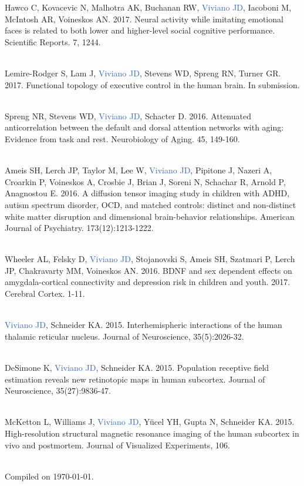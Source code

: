 \documentclass[a4paper,11pt,oneside]{book}
\begin{document}
\begin{flushleft}
Hawco C, Kovacevic N, Malhotra AK, Buchanan RW, \textcolor{highlight}{Viviano JD}, Iacoboni M, McIntosh AR, Voineskos AN. 2017. Neural activity while imitating emotional faces is related to both lower and higher-level social cognitive performance. Scientific Reports. 7, 1244. \\\

Lemire-Rodger S, Lam J, \textcolor{highlight}{Viviano JD}, Stevens WD, Spreng RN, Turner GR. 2017. Functional topology of executive control in the human brain. In submission. \\\

Spreng NR, Stevens WD, \textcolor{highlight}{Viviano JD}, Schacter D. 2016. Attenuated anticorrelation between the default and dorsal attention networks with aging: Evidence from task and rest. Neurobiology of Aging. 45, 149-160. \\\

Ameis SH, Lerch JP, Taylor M, Lee W, \textcolor{highlight}{Viviano JD}, Pipitone J, Nazeri A, Croarkin P, Voineskos A, Crosbie J, Brian J, Soreni N, Schachar R, Arnold P, Anagnostou E. 2016. A diffusion tensor imaging study in children with ADHD, autism spectrum disorder, OCD, and matched controls: distinct and non-distinct white matter disruption and dimensional brain-behavior relationships. American Journal of Psychiatry. 173(12):1213-1222. \\\

Wheeler AL, Felsky D, \textcolor{highlight}{Viviano JD}, Stojanovski S, Ameis SH, Szatmari P, Lerch JP, Chakravarty MM, Voineskos AN. 2016. BDNF and sex dependent effects on amygdala-cortical connectivity and depression risk in children and youth. 2017. Cerebral Cortex. 1-11. \\\

\textcolor{highlight}{Viviano JD}, Schneider KA. 2015. Interhemispheric interactions of the human thalamic reticular nucleus. Journal of Neuroscience, 35(5):2026-32. \\\

DeSimone K, \textcolor{highlight}{Viviano JD}, Schneider KA. 2015. Population receptive field estimation reveals new retinotopic maps in human subcortex. Journal of Neuroscience, 35(27):9836-47. \\\

McKetton L, Williams J, \textcolor{highlight}{Viviano JD}, Yücel YH, Gupta N, Schneider KA. 2015. High-resolution structural magnetic resonance imaging of the human subcortex in vivo and postmortem. Journal of Visualized Experiments, 106. \\\

\end{flushleft}

\vfill

\begin{center}
\small{Compiled on \usdate\today.}
\end{center}
\end{document}
